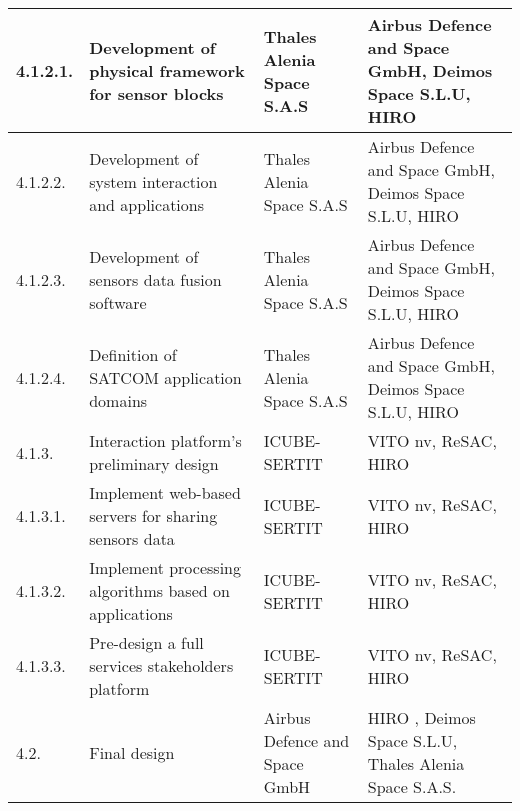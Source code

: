 \begin{longtable}[H]{p{1.5cm} >{\raggedright\arraybackslash}p{4cm} >{\raggedright\arraybackslash}p{3.8cm} >{\raggedright\arraybackslash}p{4cm}}
	\midrule
	
	4.1.2.1. & Development of physical framework for sensor blocks & Thales Alenia Space S.A.S & Airbus Defence and Space GmbH, Deimos Space S.L.U, HIRO\vspace{0.2cm} \\
	
	\midrule
	
	4.1.2.2. & Development of system interaction and applications & Thales Alenia Space S.A.S & Airbus Defence and Space GmbH, Deimos Space S.L.U, HIRO\vspace{0.2cm} \\
	
	\midrule
	
	4.1.2.3. & Development of sensors data fusion software & Thales Alenia Space S.A.S & Airbus Defence and Space GmbH, Deimos Space S.L.U, HIRO\vspace{0.2cm} \\
	
	\midrule
	
	4.1.2.4. & Definition of SATCOM application domains & Thales Alenia Space S.A.S & Airbus Defence and Space GmbH, Deimos Space S.L.U, HIRO\vspace{0.2cm} \\
	
	\midrule
	
	4.1.3. & Interaction platform's preliminary design & ICUBE-SERTIT & VITO nv, ReSAC, HIRO\vspace{0.2cm} \\
	
	\midrule
	
	4.1.3.1. & Implement web-based servers for sharing sensors data & ICUBE-SERTIT & VITO nv, ReSAC, HIRO\vspace{0.2cm} \\
	
	\midrule
	
	4.1.3.2. & Implement processing algorithms based on applications & ICUBE-SERTIT & VITO nv, ReSAC, HIRO\vspace{0.2cm} \\
	
	\midrule
	
	4.1.3.3. & Pre-design a full services stakeholders platform & ICUBE-SERTIT & VITO nv, ReSAC, HIRO\vspace{0.2cm} \\
	
	\midrule
	
	4.2. & Final design & Airbus Defence and Space GmbH & HIRO , Deimos Space S.L.U, Thales Alenia Space S.A.S.\vspace{0.2cm} \\
	

\end{longtable}
